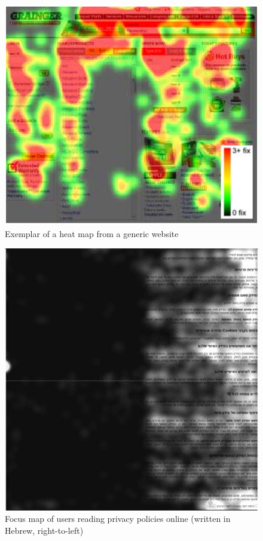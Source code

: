 \begin{figure}[!ht]
    \centering
    \includegraphics[width=0.75\linewidth]{images/HeatMap_bojko2009informative.png}
    \caption{
       Exemplar of a heat map from a generic website \autocite[32]{bojko2009informative}
    }
    \label{figure:HeatMap}
\end{figure}

\begin{figure}[!ht]
    \centering
    \includegraphics[width=0.75\linewidth]{images/focusMap_steinfeld2016agree.png}
    \caption{
       Focus map of users reading privacy policies online (written in Hebrew, right-to-left) \autocite[997]{steinfeld2016agree}
    }
    \label{figure:FocusMap}
\end{figure}

